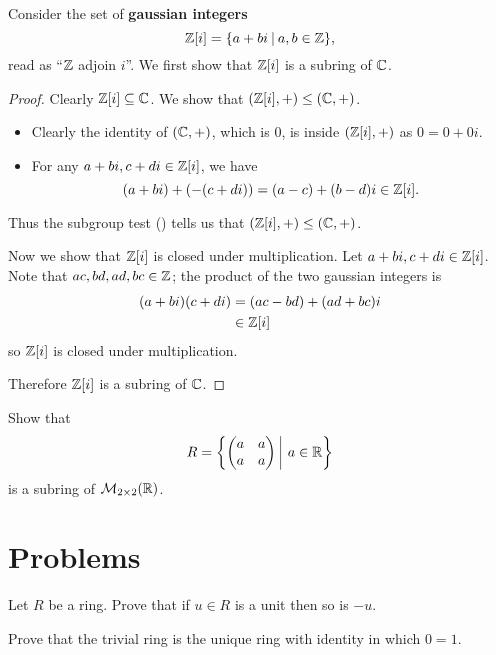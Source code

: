 \begin{example}
    Consider the set of \textbf{gaussian integers}
    \[
        \Z[i] = \{a + bi \vert a,b\in\mathbb{Z}\},
    \]
    read as ``$\mathbb{Z}$ adjoin $i$''. We first show that $\mathbb{Z}[i]$ is a subring of $\mathbb{C}$.
    \begin{proof}
        Clearly $\mathbb{Z}[i] \subseteq \mathbb{C}$. We show that $(\mathbb{Z}[i], +) \leq (\mathbb{C}, +)$.
        \begin{itemize}
            \item Clearly the identity of $(\mathbb{C}, +)$, which is 0, is inside $(\mathbb{Z}[i], +)$ as $0 = 0 + 0i$.
            \item For any $a + bi, c+di \in \mathbb{Z}[i]$, we have
            \[
                (a+bi) + (-(c+di)) = (a-c) + (b-d)i \in \mathbb{Z}[i].
            \]
        \end{itemize}
        Thus the subgroup test () tells us that $(\mathbb{Z}[i], +) \leq (\mathbb{C}, +)$.

        Now we show that $\mathbb{Z}[i]$ is closed under multiplication. Let $a + bi, c+di \in \mathbb{Z}[i]$. Note that $ac, bd, ad, bc \in \mathbb{Z}$; the product of the two gaussian integers is
        \begin{align*}
            (a+bi)(c+di) &= (ac-bd) + (ad+bc)i\\
            &\in \mathbb{Z}[i]
        \end{align*}
        so $\mathbb{Z}[i]$ is closed under multiplication.
        
        Therefore $\mathbb{Z}[i]$ is a subring of $\mathbb{C}$.
    \end{proof}
\end{example}
\begin{exercise}
    Show that
    \[
        R = \left\{\begin{pmatrix}a&a\\a&a\end{pmatrix} \vert a \in \R\right\}
    \]
    is a subring of $\mathcal{M}_{2\times2}(\mathbb{R})$.
\end{exercise}

\newpage

\section{Problems}
\begin{problem}
    Let $R$ be a ring. Prove that if $u \in R$ is a unit then so is $-u$.
\end{problem}

\begin{problem}
    Prove that the trivial ring is the unique ring with identity in which $0 = 1$.
\end{problem}


